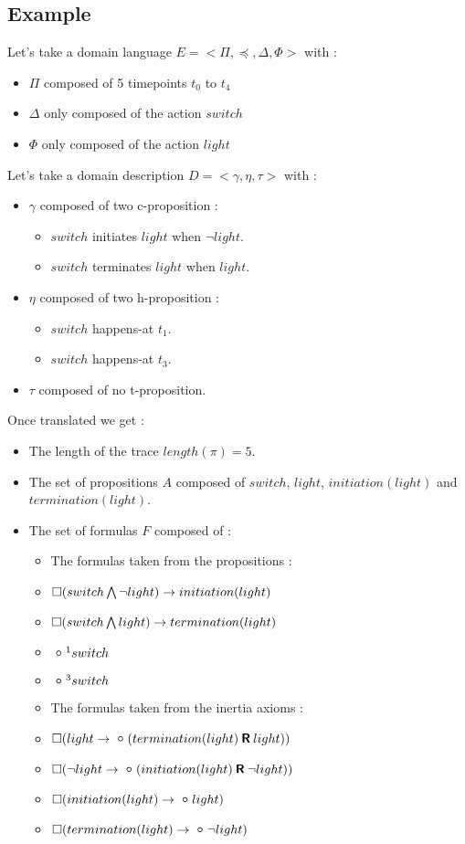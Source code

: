 \subsection{Example}

Let's take a domain language $E=<\Pi,\preceq,\Delta,\Phi>$ with :
\begin{itemize}
  \item $\Pi$ composed of 5 timepoints $t_0$ to $t_4$
  \item $\Delta$ only composed of the action $switch$
  \item $\Phi$ only composed of the action $light$
\end{itemize}

Let's take a domain description $D=<\gamma,\eta,\tau>$ with :
\begin{itemize}
  \item $\gamma$ composed of two c-proposition :
  \begin{itemize}
    \item $switch$ initiates $light$ when $\neg light$.
    \item $switch$ terminates $light$ when $light$.
  \end{itemize}
  \item $\eta$ composed of two h-proposition :
  \begin{itemize}
    \item $switch$ happens-at $t_1$.
    \item $switch$ happens-at $t_3$.
  \end{itemize}
  \item $\tau$ composed of no t-proposition.
\end{itemize}

Once translated we get :
\begin{itemize}
  \item The length of the trace $length(\pi)=5$.
  \item The set of propositions $A$ composed of $switch$, $light$, $initiation(light)$ and $termination(light)$.
  \item The set of formulas $F$ composed of :
  \begin{itemize}
    \item The formulas taken from the propositions :
    \item $\square(switch\bigwedge \neg light)\rightarrow initiation(light)$
    \item $\square(switch\bigwedge light)\rightarrow termination(light)$
    \item $\next^{1}switch$
    \item $\next^{3}switch$
    \item The formulas taken from the inertia axioms :
    \item $\alwaysF(light\rightarrow\next (termination(light) \release light))$
    \item $\alwaysF(\neg light\rightarrow\next (initiation(light) \release \neg light))$
    \item $\alwaysF(initiation(light)\rightarrow\next light)$
    \item $\alwaysF(termination(light)\rightarrow\next \neg light)$
  \end{itemize}
\end{itemize}

